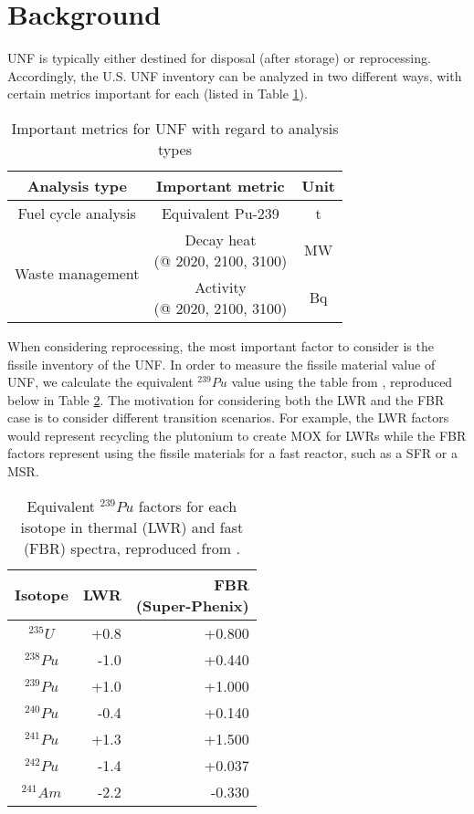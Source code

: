 \documentclass{anstrans}
\begin{document}
\section{Background}
\gls{UNF} is typically either destined for disposal (after storage) or reprocessing.
Accordingly, the U.S. \gls{UNF} inventory can be analyzed in two different
ways, with certain metrics important for each (listed in Table \ref{tab:met}).

\begin{table}[h]
    \centering
    \begin{tabular}{ccc}
        \hline
        Analysis type & Important metric & Unit\\
        \hline
        Fuel cycle analysis & Equivalent Pu-239 & t \\
        \hline
        \multirow{2}{*}{Waste management} & \shortstack{Decay heat \\ (@ 2020, 2100, 3100)} & MW\\
        & \shortstack{Activity \\ (@ 2020, 2100, 3100)} & Bq \\
        \hline
    \end{tabular}
    \caption{Important metrics for \gls{UNF} with regard to analysis types }
    \label{tab:met}
\end{table}

When considering reprocessing, the most important
factor to consider is the fissile inventory of the \gls{UNF}.
In order to measure the fissile material value of \gls{UNF}, we calculate
the equivalent $^{239}Pu$ value using the table from \cite{anon_plutonium_1989}, reproduced below in Table \ref{tab:pu_equiv}.
The motivation for considering both the \gls{LWR} and the \gls{FBR} case is to
consider different transition scenarios. For example, the LWR factors
would represent recycling the plutonium to create \gls{MOX} for \glspl{LWR} while the \gls{FBR} factors represent using the fissile
materials for a fast reactor, such as a \gls{SFR} or a \gls{MSR}.

\begin{table}[h]
    \centering
    \begin{tabular}{crr}
        \hline
        Isotope & LWR & \shortstack{FBR\\ (Super-Phenix)} \\
        \hline
        $^{235}U$ & +0.8 & +0.800 \\
        $^{238}Pu$ & -1.0 & +0.440 \\
        $^{239}Pu$ & +1.0 & +1.000 \\
        $^{240}Pu$ & -0.4 & +0.140 \\
        $^{241}Pu$ & +1.3 & +1.500 \\
        $^{242}Pu$ & -1.4 & +0.037 \\
        $^{241}Am$ & -2.2 & -0.330 \\
        \hline
    \end{tabular}
    \caption{Equivalent $^{239}Pu$ factors for each isotope in thermal (LWR) and fast (FBR) spectra,
             reproduced from \cite{anon_plutonium_1989}.}
    \label{tab:pu_equiv}
\end{table}
\end{document}
